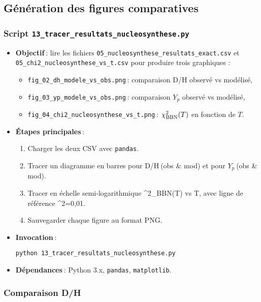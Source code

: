 \subsection{Génération des figures comparatives}

\subsubsection*{Script \texttt{13\_tracer\_resultats\_nucleosynthese.py}}

\begin{itemize}
  \item \textbf{Objectif} : lire les fichiers \texttt{05\_nucleosynthese\_resultats\_exact.csv} et \texttt{05\_chi2\_nucleosynthese\_vs\_t.csv} pour produire trois graphiques :
    \begin{itemize}
      \item \texttt{fig\_02\_dh\_modele\_vs\_obs.png} : comparaison D/H observé vs modélisé,
      \item \texttt{fig\_03\_yp\_modele\_vs\_obs.png} : comparaison \(Y_{p}\) observé vs modélisé,
      \item \texttt{fig\_04\_chi2\_nucleosynthese\_vs\_t.png} : \(\chi^{2}_{\rm BBN}(T)\) en fonction de \(T\).
    \end{itemize}

  \item \textbf{Étapes principales} :
    \begin{enumerate}
      \item Charger les deux CSV avec \texttt{pandas}.
      \item Tracer un diagramme en barres pour D/H (obs & mod) et pour \(Y_{p}\) (obs & mod).
      \item Tracer en échelle semi-logarithmique \chi^{2}_{\rm BBN}(T) vs T, avec ligne de référence \chi^{2}=0{,}01.
      \item Sauvegarder chaque figure au format PNG.
    \end{enumerate}

  \item \textbf{Invocation} :
    \begin{verbatim}
python 13_tracer_resultats_nucleosynthese.py
    \end{verbatim}

  \item \textbf{Dépendances} : Python 3.x, \texttt{pandas}, \texttt{matplotlib}.
\end{itemize}

\subsubsection*{Comparaison D/H}

